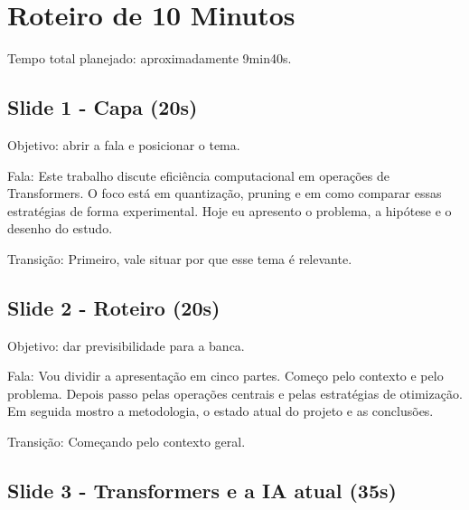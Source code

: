 

\chapter{Roteiro de 10 Minutos}



Tempo total planejado: aproximadamente 9min40s.



\section{Slide 1 - Capa (20s)}


Objetivo: abrir a fala e posicionar o tema.






Fala: Este trabalho discute eficiência computacional em operações de Transformers. O foco está em quantização, pruning e em como comparar essas estratégias de forma experimental. Hoje eu apresento o problema, a hipótese e o desenho do estudo.




Transição: Primeiro, vale situar por que esse tema é relevante.



\section{Slide 2 - Roteiro (20s)}


Objetivo: dar previsibilidade para a banca.







Fala: Vou dividir a apresentação em cinco partes. Começo pelo contexto e pelo problema. Depois passo pelas operações centrais e pelas estratégias de otimização. Em seguida mostro a metodologia, o estado atual do projeto e as conclusões.




Transição: Começando pelo contexto geral.



\section{Slide 3 - Transformers e a IA atual (35s)}


